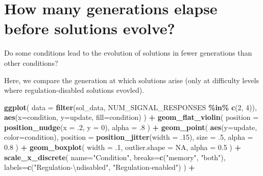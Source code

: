 \documentclass[
]{book}
\newenvironment{Shaded}{\begin{snugshade}}{\end{snugshade}}
\newcommand{\CharTok}[1]{\textcolor[rgb]{0.31,0.60,0.02}{#1}}
\newcommand{\DataTypeTok}[1]{\textcolor[rgb]{0.13,0.29,0.53}{#1}}
\newcommand{\DecValTok}[1]{\textcolor[rgb]{0.00,0.00,0.81}{#1}}
\newcommand{\FloatTok}[1]{\textcolor[rgb]{0.00,0.00,0.81}{#1}}
\newcommand{\KeywordTok}[1]{\textcolor[rgb]{0.13,0.29,0.53}{\textbf{#1}}}
\newcommand{\NormalTok}[1]{#1}
\newcommand{\OperatorTok}[1]{\textcolor[rgb]{0.81,0.36,0.00}{\textbf{#1}}}
\newcommand{\OtherTok}[1]{\textcolor[rgb]{0.56,0.35,0.01}{#1}}
\newcommand{\StringTok}[1]{\textcolor[rgb]{0.31,0.60,0.02}{#1}}
\begin{document}
\hypertarget{how-many-generations-elapse-before-solutions-evolve}{%
\section{How many generations elapse before solutions evolve?}\label{how-many-generations-elapse-before-solutions-evolve}}

Do some conditions lead to the evolution of solutions in fewer generations than other conditions?

Here, we compare the generation at which solutions arise (only at difficulty levels where regulation-disabled solutions evovled).

\begin{Shaded}
\begin{Highlighting}[]
\KeywordTok{ggplot}\NormalTok{( }\DataTypeTok{data =} \KeywordTok{filter}\NormalTok{(sol\_data, NUM\_SIGNAL\_RESPONSES }\OperatorTok{\%in\%}\StringTok{ }\KeywordTok{c}\NormalTok{(}\DecValTok{2}\NormalTok{, }\DecValTok{4}\NormalTok{)), }\KeywordTok{aes}\NormalTok{(}\DataTypeTok{x=}\NormalTok{condition, }\DataTypeTok{y=}\NormalTok{update, }\DataTypeTok{fill=}\NormalTok{condition) ) }\OperatorTok{+}
\StringTok{  }\KeywordTok{geom\_flat\_violin}\NormalTok{(}
    \DataTypeTok{position =} \KeywordTok{position\_nudge}\NormalTok{(}\DataTypeTok{x =} \FloatTok{.2}\NormalTok{, }\DataTypeTok{y =} \DecValTok{0}\NormalTok{),}
    \DataTypeTok{alpha =} \FloatTok{.8}
\NormalTok{  ) }\OperatorTok{+}
\StringTok{  }\KeywordTok{geom\_point}\NormalTok{(}
    \KeywordTok{aes}\NormalTok{(}\DataTypeTok{y=}\NormalTok{update, }\DataTypeTok{color=}\NormalTok{condition),}
    \DataTypeTok{position =} \KeywordTok{position\_jitter}\NormalTok{(}\DataTypeTok{width =} \FloatTok{.15}\NormalTok{),}
    \DataTypeTok{size =} \FloatTok{.5}\NormalTok{,}
    \DataTypeTok{alpha =} \FloatTok{0.8}
\NormalTok{  ) }\OperatorTok{+}
\StringTok{  }\KeywordTok{geom\_boxplot}\NormalTok{(}
    \DataTypeTok{width =} \FloatTok{.1}\NormalTok{,}
    \DataTypeTok{outlier.shape =} \OtherTok{NA}\NormalTok{,}
    \DataTypeTok{alpha =} \FloatTok{0.5}
\NormalTok{  ) }\OperatorTok{+}
\StringTok{  }\KeywordTok{scale\_x\_discrete}\NormalTok{(}
    \DataTypeTok{name=}\StringTok{"Condition"}\NormalTok{,}
    \DataTypeTok{breaks=}\KeywordTok{c}\NormalTok{(}\StringTok{"memory"}\NormalTok{, }\StringTok{"both"}\NormalTok{),}
    \DataTypeTok{labels=}\KeywordTok{c}\NormalTok{(}\StringTok{"Regulation{-}}\CharTok{\textbackslash{}n}\StringTok{disabled"}\NormalTok{, }\StringTok{"Regulation{-}enabled"}\NormalTok{)}
\NormalTok{  ) }\OperatorTok{+}

\end{Highlighting}
\end{Shaded}
\end{document}
